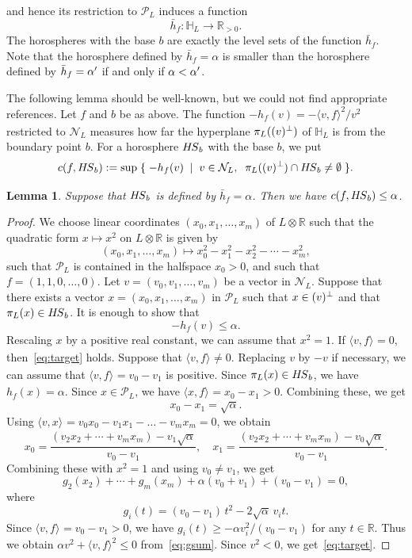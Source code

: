 \documentclass{amsart}
\theoremstyle{plain}
\newtheorem{lemma}[theorem]{Lemma}
\theoremstyle{definition}
\theoremstyle{remark}
\numberwithin{equation}{section}
\numberwithin{table}{section}
\numberwithin{figure}{section}
\renewcommand{\H}{\mathord{\mathbb H}}
\newcommand{\R}{\mathord{\mathbb R}}
\newcommand{\NNN}{\mathord{\mathcal N}}
\newcommand{\PPP}{\mathord{\mathcal P}}
\newcommand{\set}[2]{\{\; {#1} \; \mid \; {#2} \;  \}}
\newcommand{\tensor}{\otimes}
\newcommand{\sprime}{\sp\prime}
\newcommand{\sperp}{\sp{\perp}}
\newcommand{\bdr}{\partial\,}
\newcommand{\intM}[2]{\langle{#1}\rangle_{#2}}
\newcommand{\clPPP}{\overline{\PPP}}
\newcommand{\clH}{\overline{\H}}
\newcommand{\bdrclH}{\bdr\clH}
\newcommand{\HS}{\mathord{H\hskip -1pt S}}
\begin{document}
and hence its restriction to $\PPP_L$
induces a function
$$
\bar{h}_f\colon \H_L \to \R_{>0}.
$$
The horospheres with the base $b$ are exactly the level sets of the function $\bar{h}_f$.
Note that the horosphere defined by  $\bar{h}_f=\alpha$
is smaller than
the horosphere defined by  $\bar{h}_f=\alpha\sprime$ if and only if $\alpha<\alpha\sprime$.
%
%
\par
%
The following lemma should be well-known,
but we could not find appropriate references.
Let $f$ and $b$ be as above.
The function $-h_f(v)=-\intM{v, f}{}^2/v^2$ restricted to $\NNN_L$
measures how far  the hyperplane $\pi_L((v)\sperp)$ of $\H_L$
is from  the boundary point $b$.
For a horosphere $\HS_b$ with the base $b$, 
we put
$$
c(f, \HS_b):=\sup\; \set{-h_f(v)}{v\in \NNN_L, \;\;\pi_L((v)\sperp)\cap \HS_b \ne \emptyset}.
$$
%
\begin{lemma}\label{lemma:HS}
Suppose that $\HS_b$  is defined by $\bar{h}_f=\alpha$.
Then we have $c(f, \HS_b)\le \alpha$.
\end{lemma}
%
\begin{proof}
We choose  linear coordinates $(x_0, x_1, \dots, x_m)$ of $L\tensor\R$ such that
the quadratic form $x\mapsto x^2$ on $L\tensor \R$ is given by
$$
(x_0, x_1, \dots, x_m)\mapsto x_0^2-x_1^2-x_2^2-\cdots-x_m^2,
$$
such that $\PPP_L$ is contained in the halfspace $x_0> 0$, and such that
$f=(1,1,0,\dots, 0)$.
Let $v=(v_0,  v_1, \dots, v_m)$ be a vector in $\NNN_L$.
Suppose that there  exists a  vector  $x=(x_0, x_1, \dots, x_m)$ in $\PPP_L$
such that $x\in (v)\sperp$ and that $\pi_L(x)\in \HS_b$.
It is enough to show that
%
\begin{equation}\label{eq:target}
-h_f(v)\le \alpha.
\end{equation}
%
Rescaling $x$ by a positive real constant, we can assume that $x^2=1$.
If $\intM{v, f}{}=0$, then~\eqref{eq:target} holds.
Suppose that $\intM{v, f}{}\ne 0$.
Replacing $v$ by  $-v$ if necessary, we can assume that $\intM{v, f}{}=v_0-v_1$ is positive.
Since  $\pi_L(x)\in \HS_b$, we have $h_f(x)=\alpha$. 
Since $x\in \PPP_L$, we have $\intM{x, f}{}=x_0-x_1>0$.
Combining these,
we get
$$
x_0-x_1=\sqrt{\alpha}.
$$
Using $\intM{v, x}{}=v_0x_0-v_1 x_1- \dots-v_m x_m=0$, we obtain
$$
x_0=\frac{(v_2x_2+\cdots+v_m x_m)-v_1\sqrt{\alpha}}{v_0-v_1},
\quad
x_1=\frac{(v_2x_2+\cdots+v_m x_m)-v_0\sqrt{\alpha}}{v_0-v_1}.
$$
Combining these with $x^2=1$ and using $v_0\ne v_1$, we get
%
\begin{equation}\label{eq:gsum}
g_2(x_2)+\cdots +g_m(x_m)+\alpha(v_0+v_1)+(v_0-v_1)=0,
\end{equation}
%
where
$$
g_i(t)=(v_0-v_1)\,t^2-2\sqrt{\alpha} \,v_i t.
$$
Since $\intM{v, f}{}=v_0-v_1>0$, we have  $g_i(t)\ge -\alpha v_i^2/(v_0-v_1)$ for any $t\in \R$.
Thus we obtain $\alpha v^2+\intM{v, f}{}^2\le 0$ from~\eqref{eq:gsum}.
Since $v^2<0$, we get~\eqref{eq:target}.
\end{proof}
%
\end{document}
